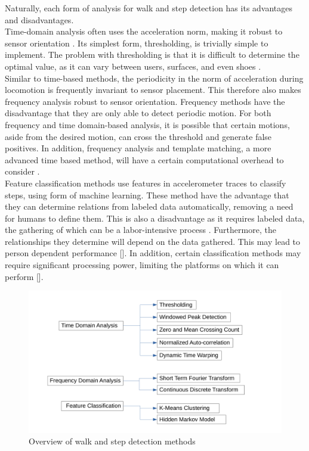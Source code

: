 Naturally, each form of analysis for walk and step detection has its advantages and disadvantages.\\
Time-domain analysis often uses the acceleration norm, making it robust to sensor orientation \cite{Davidson2017}. Its simplest form, thresholding, is trivially simple to implement. The problem with thresholding is that it is difficult to determine the optimal value, as it can vary between users, surfaces, and even shoes \cite{Brajdic2013}. \\
Similar to time-based methods, the periodicity in the norm of acceleration during locomotion is frequently invariant to sensor placement. This therefore also makes frequency analysis robust to sensor orientation. Frequency methods have the disadvantage that they are only able to detect periodic motion. 
For both frequency and time domain-based analysis, it is possible that certain motions, aside from the desired motion, can cross the threshold and generate false positives. In addition, frequency analysis and template matching, a more advanced time based method, will have a certain computational overhead to consider \cite{Davidson2017, Harle2013}. \\
Feature classification methods use features in accelerometer traces to classify steps, using form of machine learning. These method have the advantage that they can determine relations from labeled data automatically, removing a need for humans to define them. This is also a disadvantage as it requires labeled data, the gathering of which can be a labor-intensive process \cite{Bulling2014}. Furthermore, the relationships they determine will depend on the data gathered. This may lead to person dependent performance [\qn]. In addition, certain classification methods may require significant processing power, limiting the platforms on which it can perform [\qn].


\begin{figure}
	\centering
	\includegraphics[trim=0 15 0 20, clip,width=0.7\linewidth]{images/step_detection_options}
	\caption{Overview of walk and step detection methods}
	\label{fig:step_detection_options}
\end{figure}

